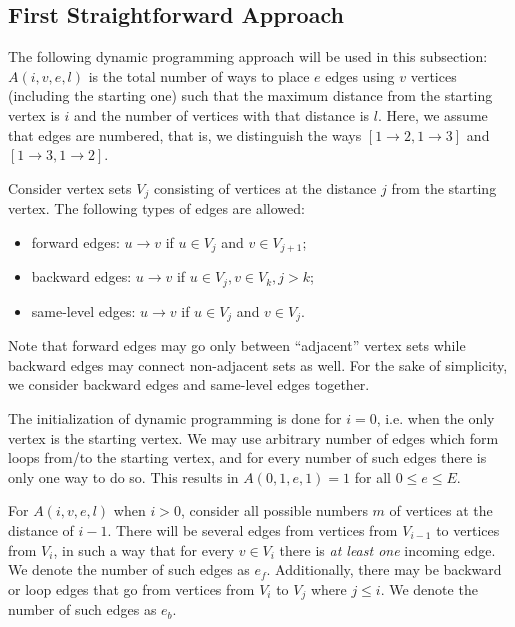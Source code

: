\documentclass{llncs}
\begin{document}
  \subsection{First Straightforward Approach}
  
  The following dynamic programming approach will be used in this subsection:
  $A(i,v,e,l)$ is the total number of ways to place $e$ edges using $v$ vertices (including the 
  starting one) such that the maximum distance from the starting vertex is $i$ and the number of
  vertices with that distance is $l$. Here, we assume that edges are numbered, that is, we 
  distinguish the ways $[1 \to 2, 1 \to 3]$ and $[1 \to 3, 1 \to 2]$.
  
  Consider vertex sets $V_j$ consisting of vertices at the distance $j$ from the starting vertex.
  The following types of edges are allowed:
  \begin{itemize}
      \item forward edges: $u \to v$ if $u \in V_j$ and $v \in V_{j+1}$;
      \item backward edges: $u \to v$ if $u \in V_j, v \in V_k, j > k$;
      \item same-level edges: $u \to v$ if $u \in V_j$ and $v \in V_j$.
  \end{itemize}
  
  Note that forward edges may go only between ``adjacent'' vertex sets while backward edges may 
  connect non-adjacent sets as well. For the sake of simplicity, we consider backward edges and 
  same-level edges together.
  
  The initialization of dynamic programming is done for $i = 0$, i.e. when the only vertex is the 
  starting vertex. We may use arbitrary number of edges which form loops from/to the starting 
  vertex, and for every number of such edges there is only one way to do so. This results in 
  $A(0,1,e,1) = 1$ for all $0 \le e \le E$.
  
  For $A(i,v,e,l)$ when $i > 0$, consider all possible numbers $m$ of vertices at the distance of $i - 1$.
  There will be several edges from vertices from $V_{i-1}$ to vertices from $V_{i}$, in such a way that for every $v 
  \in V_{i}$ there is \emph{at least one} incoming edge. We denote the number of such edges as $e_f$.
  Additionally, there may be backward or loop edges that go from vertices from $V_i$ to $V_j$ where $j \le i$.
  We denote the number of such edges as $e_b$.
  
\end{document}
